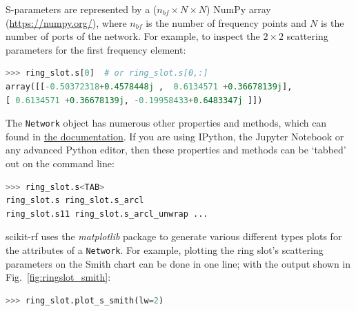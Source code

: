 \documentclass[10pt, letterpaper]{scrartcl}
\newcommand{\skrf}{{s}cikit-rf\xspace}
\begin{document}
S-parameters are represented by a ($n_{bf} \times N \times N$) NumPy array \cite{harris2020} (\url{https://numpy.org/}), where $n_{bf}$ is the number of frequency points and $N$ is the number of ports of the network. For example, to inspect the $2 \times 2$ scattering parameters for the first frequency element:

\begin{lstlisting}[language=Python]
>>> ring_slot.s[0]  # or ring_slot.s[0,:]
array([[-0.50372318+0.4578448j ,  0.6134571 +0.36678139j],
[ 0.6134571 +0.36678139j, -0.19958433+0.6483347j ]])
\end{lstlisting}

The \texttt{Network} object has numerous other properties and methods, which can found in  \href{https://scikit-rf.readthedocs.io}{the documentation}. If you are using IPython\cite{perez2007}, the Jupyter Notebook\cite{granger2021} or any advanced Python editor, then these properties and methods can be ‘tabbed’ out on the command line:

\begin{lstlisting}[language=Python]
>>> ring_slot.s<TAB>
ring_slot.s ring_slot.s_arcl
ring_slot.s11 ring_slot.s_arcl_unwrap ...
\end{lstlisting}

\skrf{} uses the \textit{matplotlib} package \cite{Hunter:2007} to generate various different types plots for the attributes of a \texttt{Network}. For example, plotting the ring slot’s scattering parameters on the Smith chart can be done in one line; with the output shown in Fig.~\ref{fig:ringslot_smith}:

\begin{lstlisting}[language=Python]
>>> ring_slot.plot_s_smith(lw=2)
\end{lstlisting}
\end{document}
